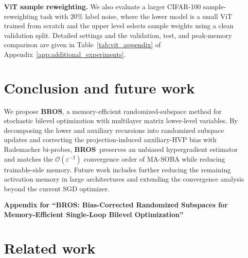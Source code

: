 \documentclass{pkumelon}
\theoremstyle{plain}
\newcommand{\oursname}{\textnormal{\textbf{BROS}}}
\newcommand{\ours}{\oursname\ }
\newcommand{\ourslast}{\oursname}
\begin{document}
\textbf{ViT sample reweighting.} We also evaluate a larger CIFAR-100 sample-reweighting task with $20\%$ label noise, where the lower model is a small ViT trained from scratch and the upper level selects sample weights using a clean validation split. Detailed settings and the validation, test, and peak-memory comparison are given in Table~\ref{tab:vit_appendix} of Appendix~\ref{app:additional_experiments}.

\section{Conclusion and future work}
We propose \ourslast, a memory-efficient randomized-subspace method for stochastic bilevel optimization with multilayer matrix lower-level variables. By decomposing the lower and auxiliary recursions into randomized subspace updates and correcting the projection-induced auxiliary-HVP bias with Rademacher bi-probes, \ours preserves an unbiased hypergradient estimator and matches the $\mathcal O(\varepsilon^{-2})$ convergence order of MA-SOBA while reducing trainable-side memory. Future work includes further reducing the remaining activation memory in large architectures and extending the convergence analysis beyond the current SGD optimizer.

\newpage

{
\small



}

\newpage
\appendix
\begin{center}
{\sffamily\bfseries\fontsize{15}{18}\selectfont
    Appendix for ``BROS: Bias-Corrected Randomized Subspaces for Memory-Efficient Single-Loop Bilevel Optimization''\par}
\end{center}
\vspace{5mm}

\section{Related work}
\label{sec:related_work}
\label{app:related_work}
\end{document}
